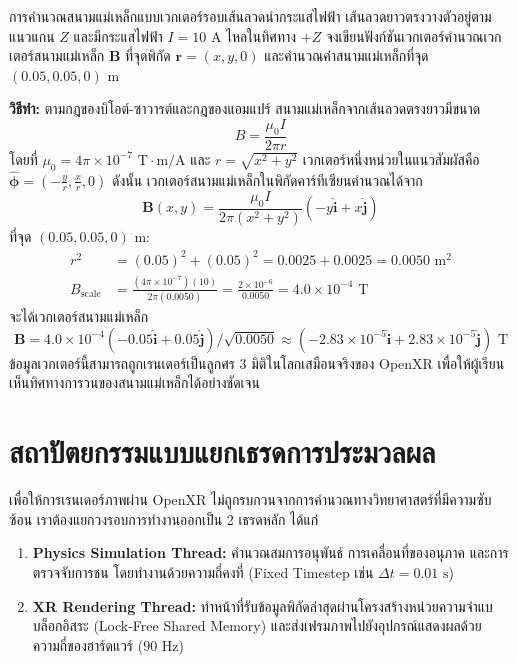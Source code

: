 \begin{workedexamplebox}{การคำนวณสนามแม่เหล็กแบบเวกเตอร์รอบเส้นลวดนำกระแสไฟฟ้า}
เส้นลวดยาวตรงวางตัวอยู่ตามแนวแกน $Z$ และมีกระแสไฟฟ้า $I = 10\text{ A}$ ไหลในทิศทาง $+Z$ จงเขียนฟังก์ชันเวกเตอร์คำนวณเวกเตอร์สนามแม่เหล็ก $\mathbf{B}$ ที่จุดพิกัด $\mathbf{r} = (x, y, 0)$ และคำนวณค่าสนามแม่เหล็กที่จุด $(0.05, 0.05, 0)\text{ m}$

\textbf{วิธีทำ:}
ตามกฎของบิโอต์-ซาวารต์และกฎของแอมแปร์ สนามแม่เหล็กจากเส้นลวดตรงยาวมีขนาด
\begin{equation}
B = \frac{\mu_0 I}{2\pi r}
\end{equation}
โดยที่ $\mu_0 = 4\pi \times 10^{-7}\text{ T}\cdot\text{m/A}$ และ $r = \sqrt{x^2 + y^2}$ เวกเตอร์หนึ่งหน่วยในแนวสัมผัสคือ $\hat{\boldsymbol{\phi}} = \left(-\frac{y}{r}, \frac{x}{r}, 0\right)$
ดังนั้น เวกเตอร์สนามแม่เหล็กในพิกัดคาร์ทีเซียนคำนวณได้จาก
\begin{equation}
\mathbf{B}(x, y) = \frac{\mu_0 I}{2\pi (x^2 + y^2)} (-y\hat{\mathbf{i}} + x\hat{\mathbf{j}})
\end{equation}
ที่จุด $(0.05, 0.05, 0)\text{ m}$:
\begin{align}
r^2 &= (0.05)^2 + (0.05)^2 = 0.0025 + 0.0025 = 0.0050\text{ m}^2 \\
B_{\text{scale}} &= \frac{(4\pi \times 10^{-7})(10)}{2\pi (0.0050)} = \frac{2 \times 10^{-6}}{0.0050} = 4.0 \times 10^{-4}\text{ T}
\end{align}
จะได้เวกเตอร์สนามแม่เหล็ก
\begin{equation}
\mathbf{B} = 4.0 \times 10^{-4} (-0.05\hat{\mathbf{i}} + 0.05\hat{\mathbf{j}}) / \sqrt{0.0050} \approx (-2.83\times 10^{-5}\hat{\mathbf{i}} + 2.83\times 10^{-5}\hat{\mathbf{j}})\text{ T}
\end{equation}
ข้อมูลเวกเตอร์นี้สามารถถูกเรนเดอร์เป็นลูกศร 3 มิติในโลกเสมือนจริงของ OpenXR เพื่อให้ผู้เรียนเห็นทิศทางการวนของสนามแม่เหล็กได้อย่างชัดเจน
\end{workedexamplebox}

\section{สถาปัตยกรรมแบบแยกเธรดการประมวลผล}

เพื่อให้การเรนเดอร์ภาพผ่าน OpenXR ไม่ถูกรบกวนจากการคำนวณทางวิทยาศาสตร์ที่มีความซับซ้อน เราต้องแยกวงรอบการทำงานออกเป็น 2 เธรดหลัก ได้แก่
\begin{enumerate}
    \item \textbf{Physics Simulation Thread:} คำนวณสมการอนุพันธ์ การเคลื่อนที่ของอนุภาค และการตรวจจับการชน โดยทำงานด้วยความถี่คงที่ (Fixed Timestep เช่น $\Delta t = 0.01\text{ s}$)
    \item \textbf{XR Rendering Thread:} ทำหน้าที่รับข้อมูลพิกัดล่าสุดผ่านโครงสร้างหน่วยความจำแบบล็อกอิสระ (Lock-Free Shared Memory) และส่งเฟรมภาพไปยังอุปกรณ์แสดงผลด้วยความถี่ของฮาร์ดแวร์ ($90\text{ Hz}$)
\end{enumerate}

